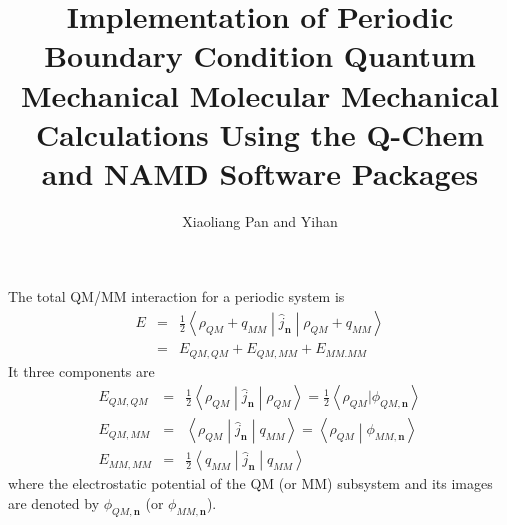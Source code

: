 \documentclass[aip,jcp,preprint,superscriptaddress,amsmath,amssymb]{revtex4-1}
\begin{document}
\title{Implementation of Periodic Boundary Condition Quantum Mechanical 
Molecular Mechanical Calculations Using the Q-Chem and NAMD Software Packages}
\author{Xiaoliang Pan and Yihan}
\maketitle

The total QM/MM interaction for a periodic system is
\begin{eqnarray}
E & = &  \frac{1}{2} \left< \rho_{QM}  + q_{MM} \middle| \hat{j}_ {\mathbf{n}} \middle| \rho_{QM}  + q_{MM} \right>  \nonumber \\
& = &  E_{QM,QM} + E_{QM,MM} + E_{MM.MM} 
\end{eqnarray} 
It three components are
\begin{eqnarray}
E_{QM,QM} & = & \frac{1}{2} \left< \rho_{QM}  \middle| \hat{j}_ {\mathbf{n}} \middle| \rho_{QM}  \right> = \frac{1}{2}   \left< \rho_{QM}  | \phi_{QM, \mathbf{n}} \right> \\
E_{QM,MM} & = & \left< \rho_{QM}  \middle| \hat{j}_ {\mathbf{n}} \middle| q_{MM}  \right> =  \left< \rho_{QM}  \middle|   \phi_{MM, \mathbf{n}} \right>  \\
E_{MM,MM} & = & \frac{1}{2} \left< q_{MM}  \middle| \hat{j}_ {\mathbf{n}} \middle| q_{MM}  \right>
\end{eqnarray}
where the electrostatic potential of the QM (or MM) subsystem and its images are denoted by $ \phi_{QM, \mathbf{n}}$  (or $\phi_{MM, \mathbf{n}} $). 
\end{document}
